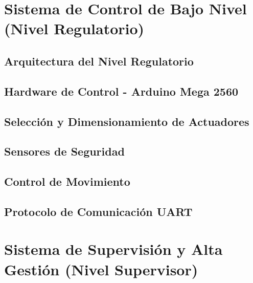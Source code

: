 \documentclass[a4paper,12pt]{report}
\begin{document}
\section{Sistema de Control de Bajo Nivel (Nivel Regulatorio)}

\subsection{Arquitectura del Nivel Regulatorio}


\subsection{Hardware de Control - Arduino Mega 2560}



\subsection{Selección y Dimensionamiento de Actuadores}




\subsection{Sensores de Seguridad}



\subsection{Control de Movimiento}




\subsection{Protocolo de Comunicación UART}



\section{Sistema de Supervisión y Alta Gestión (Nivel Supervisor)}
\end{document}
